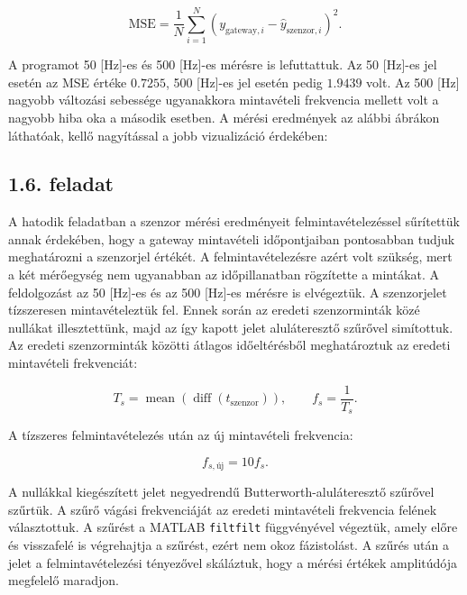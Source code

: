 \documentclass[12pt,a4paper]{article}
\newcommand{\feladat}[1]{%
\phantomsection
\subsection*{#1. feladat}%
\addcontentsline{toc}{subsection}{#1. feladat}%
}
\begin{document}
\begin{equation}
\mathrm{MSE} =
\frac{1}{N}\sum_{i=1}^{N}
\left(y_{\mathrm{gateway},i}
-\hat{y}_{\mathrm{szenzor},i}\right)^2.
\end{equation}

A programot 50 [Hz]-es és 500 [Hz]-es mérésre is lefuttattuk. Az 50 [Hz]-es jel esetén az MSE értéke $0.7255$, 500 [Hz]-es jel esetén pedig $1.9439$ volt. Az 500 [Hz] nagyobb változási sebessége ugyanakkora mintavételi frekvencia mellett volt a nagyobb hiba oka a második esetben. A mérési eredmények az alábbi ábrákon láthatóak, kellő nagyítással a jobb vizualizáció érdekében:



\feladat{1.6}

A hatodik feladatban a szenzor mérési eredményeit felmintavételezéssel
sűrítettük annak érdekében, hogy a gateway mintavételi időpontjaiban
pontosabban tudjuk meghatározni a szenzorjel értékét. A felmintavételezésre
azért volt szükség, mert a két mérőegység nem ugyanabban az
időpillanatban rögzítette a mintákat.
A feldolgozást az 50 [Hz]-es és az 500 [Hz]-es mérésre is elvégeztük. A
szenzorjelet tízszeresen mintavételeztük fel. Ennek során az eredeti
szenzorminták közé nullákat illesztettünk, majd az így kapott jelet
aluláteresztő szűrővel simítottuk. \\
Az eredeti szenzorminták közötti átlagos időeltérésből meghatároztuk az eredeti mintavételi frekvenciát:

\begin{equation}
T_s = \operatorname{mean}\left(\operatorname{diff}(t_{\mathrm{szenzor}})\right),
\qquad
f_s = \frac{1}{T_s}.
\end{equation}

A tízszeres felmintavételezés után az új mintavételi frekvencia:

\begin{equation}
f_{s,\mathrm{új}} = 10 f_s.
\end{equation}

A nullákkal kiegészített jelet negyedrendű Butterworth-aluláteresztő
szűrővel szűrtük. A szűrő vágási frekvenciáját az eredeti mintavételi
frekvencia felének választottuk. A szűrést a MATLAB \texttt{filtfilt} függvényével
végeztük, amely előre és visszafelé is végrehajtja a szűrést, ezért nem
okoz fázistolást. A szűrés után a jelet a felmintavételezési tényezővel
skáláztuk, hogy a mérési értékek amplitúdója megfelelő maradjon.\\
\end{document}
